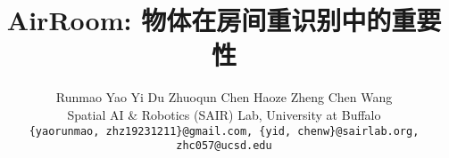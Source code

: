 \documentclass[10pt,twocolumn,letterpaper]{article}
\title{AirRoom: 物体在房间重识别中的重要性}
\author{
Runmao Yao \quad
Yi Du \quad
Zhuoqun Chen \quad
Haoze Zheng \quad
Chen Wang \\
Spatial AI \& Robotics (SAIR) Lab, University at Buffalo \\
{\tt\small \{yaorunmao, zhz19231211\}@gmail.com, \{yid, chenw\}@sairlab.org, zhc057@ucsd.edu}
}
\begin{document}
\begin{CJK*}{UTF8}{gbsn}
\maketitle






{
    \small
    
    
}



\end{CJK*}
\end{document}
